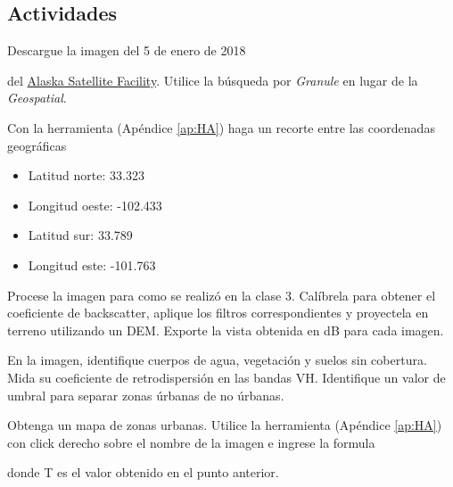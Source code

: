 \subsection{Actividades}

\begin{que}
    Descargue la imagen del 5 de enero de 2018
    \begin{center}\end{center}
      del \href{https://vertex.daac.asf.alaska.edu/}{Alaska Satellite Facility}. Utilice la búsqueda por \emph{Granule} en lugar de la \emph{Geospatial}.
\end{que}

\begin{que}
    Con la herramienta  (Apéndice \ref{ap:HA}) haga un recorte entre las coordenadas geográficas
    \begin{itemize}
        \item Latitud norte: 33.323
        \item Longitud oeste: -102.433
        \item Latitud sur: 33.789
        \item Longitud este: -101.763
    \end{itemize}
\end{que}

\begin{que}
    Procese la imagen para como se realizó en la clase 3. Calíbrela para obtener el coeficiente de backscatter, aplique los filtros correspondientes y proyectela en terreno utilizando un DEM. Exporte la vista obtenida en dB para cada imagen.
\end{que}

\begin{que}
    En la imagen, identifique cuerpos de agua, vegetación y suelos sin cobertura. Mida su coeficiente de retrodispersión en las bandas VH. Identifique un valor de umbral para separar zonas úrbanas de no úrbanas.
\end{que}

\begin{que}
  Obtenga un mapa de zonas urbanas. Utilice la herramienta  (Apéndice \ref{ap:HA}) con click derecho sobre el nombre de la imagen e ingrese la formula
  \begin{center}
  \end{center}
  donde T es el valor obtenido en el punto anterior.
\end{que}

